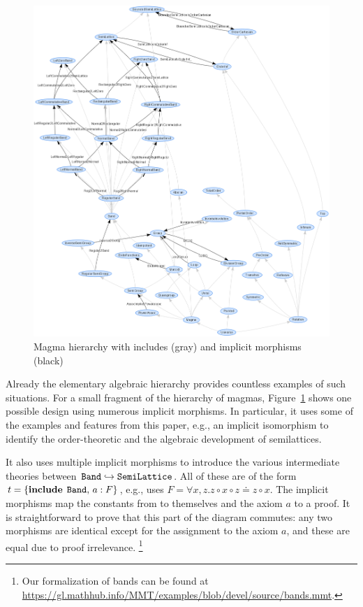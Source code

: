 \begin{figure}[htb]
	\begin{center}
		\includegraphics[width=.8\textwidth]{graph.png}
		\caption{Magma hierarchy with includes (gray) and implicit morphisms (black)}\label{fig:magmas}
	\end{center}
\end{figure}

Already the elementary algebraic hierarchy provides countless examples of such situations.
For a small fragment of the hierarchy of magmas, Figure~\ref{fig:magmas} shows one possible design using numerous implicit morphisms.
In particular, it uses some of the examples and features from this paper, e.g., an implicit isomorphism to identify the order-theoretic and the algebraic development of semilattices.

It also uses multiple implicit morphisms to introduce the various intermediate theories between $\operatorname{\mathtt{Band}}\hookrightarrow\operatorname{\mathtt{SemiLattice}}$. 
All of these are of the form $t=\{\operatorname{\mathbf{include}}{\;\operatorname{\mathtt{Band}}},\,a: F\}$, e.g.,  uses $F=\forall x,z. z\circ x\circ z \doteq z\circ x$.
The implicit morphisms map the constants from  to themselves and the axiom $a$ to a proof.
It is straightforward to prove that this part of the diagram commutes: any two morphisms are identical except for the assignment to the axiom $a$, and these are equal due to proof irrelevance.%
\footnote{Our formalization of bands can be found at \url{https://gl.mathhub.info/MMT/examples/blob/devel/source/bands.mmt}.}


